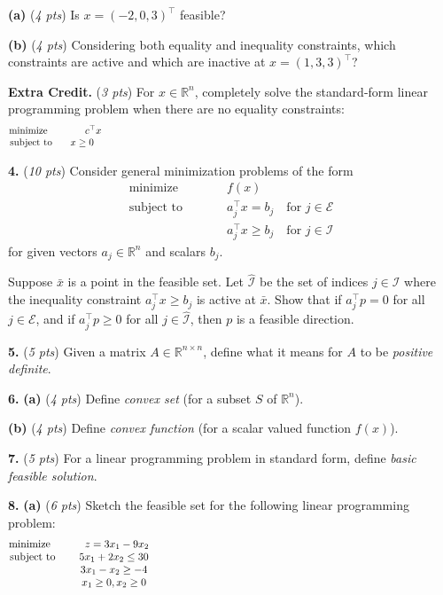 \documentclass[11pt]{amsart}
\newcommand{\RR}{{\mathbb{R}}}
\newcommand{\prob}[1]{\bigskip\noindent\textbf{#1.} }
\newcommand{\pts}[1]{(\emph{#1 pts})}
\newcommand{\probpts}[2]{\prob{#1} \pts{#2}}
\newcommand{\ppartpts}[2]{\textbf{(#1)} \pts{#2}}
\newcommand{\epartpts}[2]{\medskip\noindent \textbf{(#1)} \pts{#2}}
\begin{document}
\epartpts{a}{4}  Is $x=(-2,0,3)^\top$ feasible?
\vspace{1.0in}

\epartpts{b}{4}  Considering both equality and inequality constraints, which constraints are active and which are inactive at $x=(1,3,3)^\top$?
\vfill

\probpts{Extra Credit}{3}  For $x\in\RR^n$, completely solve the standard-form linear programming problem when there are no equality constraints:
    $$\begin{matrix}
    \text{minimize}\phantom{x} & \phantom{xxxx}c^\top x\\
    \text{subject to} & x \ge 0
    \end{matrix} \hspace{5.0in}$$
\vspace{2.5in}


\clearpage\newpage
\probpts{4}{10}  Consider general minimization problems of the form
\begin{align*}
    \text{minimize}\phantom{dflkaj} & f(x)\\
    \text{subject to}\phantom{dflkaj} & a_j^\top x = b_j \quad \text{for } j \in \mathcal{E} \\
                      & a_j^\top x \ge b_j \quad \text{for } j \in \mathcal{I}
\end{align*}
for given vectors $a_j \in \RR^n$ and scalars $b_j$.

\medskip
Suppose $\bar x$ is a point in the feasible set.  Let $\hat{\mathcal{I}}$ be the set of indices $j \in \mathcal{I}$ where the inequality constraint $a_j^\top x \ge b_j$ is active at $\bar x$.  Show that if $a_j^\top p = 0$ for all $j\in \mathcal{E}$, and if $a_j^\top p \ge 0$ for all $j\in \hat{\mathcal{I}}$, then $p$ is a feasible direction.
\vfill


\clearpage\newpage
\probpts{5}{5}  Given a matrix $A\in \RR^{n\times n}$, define what it means for $A$ to be \emph{positive definite}.
\vfill

\prob{6} \ppartpts{a}{4} Define \emph{convex set} (for a subset $S$ of $\RR^n$).
\vfill

\epartpts{b}{4} Define \emph{convex function} (for a scalar valued function $f(x)$).
\vfill

\probpts{7}{5}  For a linear programming problem in standard form, define \emph{basic feasible solution}.
\vfill


\clearpage\newpage
\prob{8} \epartpts{a}{6}  Sketch the feasible set for the following linear programming problem:
    $$\begin{matrix}
    \text{minimize}\phantom{xxx} & \phantom{x}z = 3 x_1 - 9 x_2 \\
    \text{subject to}\phantom{xx} & 5 x_1 + 2 x_2 \le 30 \\
                      & 3 x_1 - x_2 \ge -4 \\
                      & x_1 \ge 0, x_2 \ge 0
    \end{matrix} \hspace{4.0in}$$
\vfill
\end{document}
